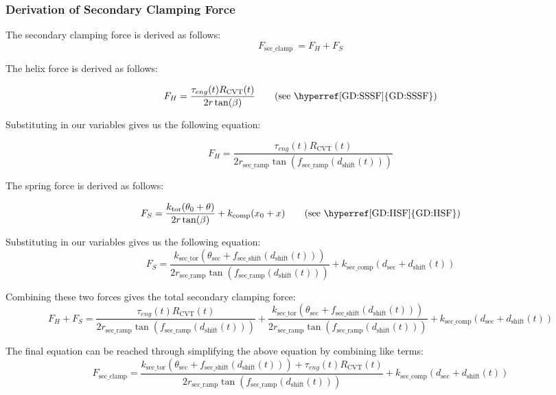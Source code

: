 \documentclass[12pt]{article}
\newcommand{\hpref}[1]{\hyperref[#1]{#1}}
\begin{document}
\subsubsection*{Derivation of Secondary Clamping Force}

The secondary clamping force is derived as follows:
\[
F_{\text{sec\_clamp}}\ = F_H + F_S
\]

The helix force is derived as follows:

\[
F_H = \frac{\tau_{eng}(t) R_{\text{CVT}}(t)}{2r\tan(\beta)}  \tag*{\text{(see \hpref{GD:SSSF})}} %
\]

Substituting in our variables gives us the following equation:

\[
F_H = \frac{\tau_{eng}(t) R_{\text{CVT}}(t)}{2 r_{\text{sec\_ramp}} \tan(f_{\text{sec\_ramp}}(d_\text{shift}(t)))}
\]

The spring force is derived as follows:

\[
F_S = \frac{k_{\text{tor}}(\theta_0 + \theta)}{2r\tan(\beta)} + k_\text{comp}(x_0 + x) \tag*{\text{(see \hpref{GD:HSF})}} %
\]

Substituting in our variables gives us the following equation:
\[
F_S = \frac{k_{\text{sec\_tor}} (\theta_{\text{sec}} + f_{\text{sec\_shift}}(d_\text{shift}(t)))}{2 r_{\text{sec\_ramp}} \tan(f_{\text{sec\_ramp}}(d_\text{shift}(t)))} + k_{\text{sec\_comp}} (d_{\text{sec}} + d_\text{shift}(t))
\]

Combining these two forces gives the total secondary clamping force:
\[
F_H + F_S = \frac{\tau_{eng}(t) R_{\text{CVT}}(t)}{2 r_{\text{sec\_ramp}} \tan(f_{\text{sec\_ramp}}(d_\text{shift}(t)))} + \frac{k_{\text{sec\_tor}} (\theta_{\text{sec}} + f_{\text{sec\_shift}}(d_\text{shift}(t)))}{2 r_{\text{sec\_ramp}} \tan(f_{\text{sec\_ramp}}(d_\text{shift}(t)))} + k_{\text{sec\_comp}} (d_{\text{sec}} + d_\text{shift}(t))
\]

The final equation can be reached through simplifying the above equation by combining like terms:
\[
F_{\text{sec\_clamp}} = \frac{k_{\text{sec\_tor}} (\theta_{\text{sec}} + f_{\text{sec\_shift}}(d_\text{shift}(t))) + \tau_{eng}(t) R_{\text{CVT}}(t)}{2 r_{\text{sec\_ramp}} \tan(f_{\text{sec\_ramp}}(d_\text{shift}(t)))} + k_{\text{sec\_comp}} (d_{\text{sec}} + d_\text{shift}(t))
\]
\end{document}
